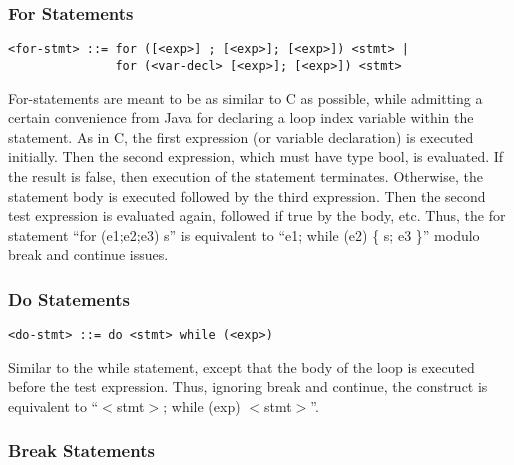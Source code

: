 \documentclass[titlepage,10pt]{article}
\begin{document}
\subsubsection{For Statements}


\begin{verbatim}
<for-stmt> ::= for ([<exp>] ; [<exp>]; [<exp>]) <stmt> |
               for (<var-decl> [<exp>]; [<exp>]) <stmt>
\end{verbatim}

For-statements are meant to be as similar to C as possible, while
admitting a certain convenience from Java for declaring a loop index
variable within the statement.  As in C, the first expression (or
variable declaration) is executed initially.  Then the second
expression, which must have type bool, is evaluated.   If the result is
false, then execution of the statement terminates.   Otherwise, the
statement body is executed followed by the third expression.   Then the
second test expression is evaluated again, followed if true by the body,
etc.  Thus, the for statement ``for (e1;e2;e3) s'' is equivalent to
``e1; while (e2) \{ s; e3 \}'' modulo break and continue issues.


\subsubsection{Do Statements}


\begin{verbatim}
<do-stmt> ::= do <stmt> while (<exp>)
\end{verbatim}

Similar to the while statement, except that the body of the loop is
executed before the test expression.  Thus, ignoring break and continue,
the construct is equivalent to ``$<$stmt$>$; while (exp) $<$stmt$>$''.


\subsubsection{Break Statements}
\end{document}
